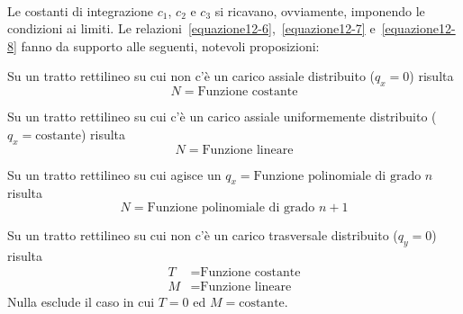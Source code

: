 \\

\noindent Le costanti di integrazione $c_1$, $c_2$ e $c_3$ si ricavano, ovviamente, imponendo le condizioni ai limiti. Le relazioni~\eqref{equazione12-6},~\eqref{equazione12-7} e~\eqref{equazione12-8} fanno da supporto alle seguenti, notevoli proposizioni:
\begin{prop}
Su un tratto rettilineo su cui non c'è un carico assiale distribuito ($q_{x} = 0 $) risulta 
\begin{equation*}
N = \text{Funzione costante}
\end{equation*}
\end{prop}
\begin{prop}
Su un tratto rettilineo su cui c'è un carico assiale uniformemente distribuito ($q_{x} = \text{costante}$) risulta 
\begin{equation*}
N = \text{Funzione lineare}
\end{equation*}
\end{prop}
\begin{prop}
Su un tratto rettilineo su cui agisce un $q_{x} = \text{Funzione polinomiale di grado } n$ risulta 
\begin{equation*}
N = \text{Funzione polinomiale di grado } n+1
\end{equation*}
\end{prop}
\begin{prop}
Su un tratto rettilineo su cui non c'è un carico trasversale distribuito ($q_{y} = 0$) risulta 
\begin{align*}
T &= \text{Funzione costante} \\ 
M &= \text{Funzione lineare} 
\end{align*}
Nulla esclude il caso in cui $T=0$ ed $M=\text{costante}$.
\end{prop}

